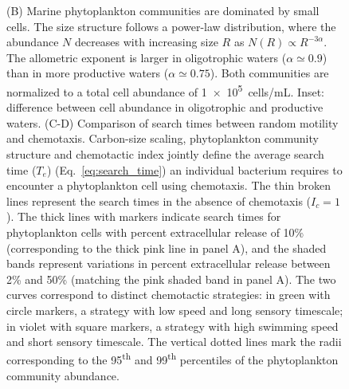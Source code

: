 \documentclass[9pt,twocolumn,twoside]{pnas-new}
\begin{document}
\begin{figure}
{        (B) Marine phytoplankton communities are dominated by small cells. The size structure follows a power-law distribution, where the abundance $N$ decreases with increasing size $R$ as $N(R) \propto R^{-3\alpha}$.
        The allometric exponent is larger in oligotrophic waters ($\alpha\simeq 0.9$) than in more productive waters ($\alpha\simeq 0.75$). Both  communities are normalized to a total cell abundance of \SI{1e5}{cells/\milli\liter}.
        Inset: difference between cell abundance in oligotrophic and productive waters.
        (C-D) Comparison of search times between random motility and chemotaxis.
        Carbon-size scaling, phytoplankton community structure and chemotactic index jointly define the average search time ($T_e$) (Eq.~\ref{eq:search_time}) an individual bacterium requires to encounter a phytoplankton cell using chemotaxis.
        The thin broken lines represent the search times in the absence of chemotaxis ($I_c=1$).
        The thick lines with markers indicate search times for phytoplankton cells with percent extracellular release of 10\% (corresponding to the thick pink line in panel A), and the shaded bands represent variations in percent extracellular release between 2\% and 50\% (matching the pink shaded band in panel A).
        The two curves correspond to distinct chemotactic strategies: in green with circle markers, a strategy with low speed and long sensory timescale; in violet with square markers, a strategy with high swimming speed and short sensory timescale.
        The vertical dotted lines mark the radii corresponding to the 95\textsuperscript{th} and 99\textsuperscript{th} percentiles of the phytoplankton community abundance.
    }
    \label{fig:ecology}
\end{figure}
\end{document}
